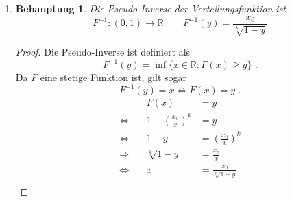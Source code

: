 \documentclass[a4paper]{scrartcl}
\newtheorem*{behaupt}{Behauptung}
\newcommand{\gdw}{\Leftrightarrow}
\def \blattnr {11}
\begin{document}
\begin{enumerate}[label=\bfseries \blattnr.\arabic*]
\begin{enumerate}
            \item
                \begin{behaupt}
                    Die Pseudo-Inverse der Verteilungsfunktion ist
                    \begin{equation*}
                        F^{-1}\colon (0,1) \to \mathbb{R}
                        \qquad
                        F^{-1}(y) = \frac{x_0}{\sqrt[k]{1-y}}
                    \end{equation*}
                \end{behaupt}
                \begin{proof}
                    Die Pseudo-Inverse ist definiert als
                    \begin{equation*}
                        F^{-1}(y)
                        = \inf \{ x \in \mathbb{R} : F(x) \geq y \}
                        \text{ .}
                    \end{equation*}
                    Da $F$ eine stetige Funktion ist, gilt sogar
                    \begin{equation*}
                        F^{-1}(y) = x
                        \gdw
                        F(x) = y
                        \text{ .}
                    \end{equation*}
                    \begin{equation*}
                        \begin{alignedat}{2}
                            && F(x) &= y \\
                            \gdw\ && 1 - \left( \frac{x_0}{x} \right)^k  &= y \\
                            \gdw\ && 1 - y  &= \left( \frac{x_0}{x} \right)^k \\
                            \Rightarrow\ && \sqrt[k]{1 - y}  &= \frac{x_0}{x} \\
                            \gdw\ && x &= \frac{x_0}{\sqrt[k]{1 - y}} \\
                        \end{alignedat}
                    \end{equation*}
                \end{proof}


\end{enumerate}
\end{enumerate}
\end{document}
